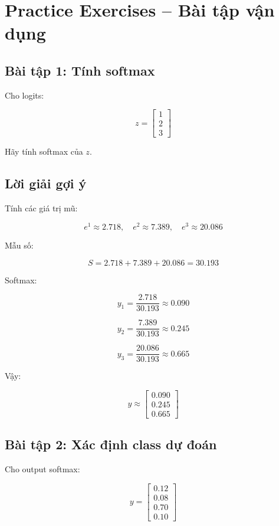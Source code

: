 \section{Practice Exercises -- Bài tập vận dụng}

\subsection*{Bài tập 1: Tính softmax}

Cho logits:

\[
    z =
    \begin{bmatrix}
    1\\
    2\\
    3
    \end{bmatrix}
\]

Hãy tính softmax của $z$.

\subsection*{Lời giải gợi ý}

Tính các giá trị mũ:

\[
    e^1\approx 2.718,\quad
    e^2\approx 7.389,\quad
    e^3\approx 20.086
\]

Mẫu số:

\[
    S=2.718+7.389+20.086=30.193
\]

Softmax:

\[
    y_1=\frac{2.718}{30.193}\approx 0.090
\]

\[
    y_2=\frac{7.389}{30.193}\approx 0.245
\]

\[
    y_3=\frac{20.086}{30.193}\approx 0.665
\]

Vậy:

\[
    y\approx
    \begin{bmatrix}
    0.090\\
    0.245\\
    0.665
    \end{bmatrix}
\]

\subsection*{Bài tập 2: Xác định class dự đoán}

Cho output softmax:

\[
    y =
    \begin{bmatrix}
    0.12\\
    0.08\\
    0.70\\
    0.10
    \end{bmatrix}
\]

